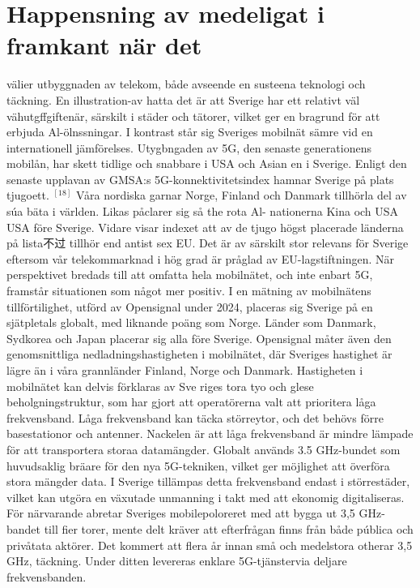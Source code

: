 {{\section*{Happensning av medeligat i framkant när det} välier utbyggnaden av telekom, både avseende en susteena teknologi och täckning. En illustration-av hatta det är att Sverige har ett relativt väl vähutgffgiftenär, särskilt i städer och tätorer, vilket ger en bragrund för att erbjuda Al-ölnssningar. I kontrast står sig Sveriges mobilnät sämre vid en internationell jämförelses.
Utygbngaden av 5G, den senaste generationens mobilån, har skett tidlige och snabbare i USA och Asian en i Sverige. Enligt den senaste upplavan av GMSA:s 5G-konnektivitetsindex hamnar Sverige på plats tjugoett. \({ }^{[18]}\) Våra nordiska garnar Norge, Finland och Danmark tillhörla del av súa bäta i världen. Likas påclarer sig så the rota Al- nationerna Kina och USA USA före Sverige. Vidare visar indexet att av de tjugo
högst placerade länderna på lista不过 tillhör end antist sex EU. Det är av särskilt stor relevans för Sverige eftersom vår telekommarknad i hög grad är pråglad av EU-lagstiftningen.
När perspektivet bredads till att omfatta hela mobilnätet, och inte enbart 5G, framstår situationen som något mer positiv. I en mätning av mobilnätens tillförtilighet, utförd av Opensignal under 2024, placeras sig Sverige på en sjätpletals globalt, med liknande poäng som Norge. Länder som Danmark, Sydkorea och Japan placerar sig alla före Sverige. Opensignal måter även den genomsnittliga nedladningshastigheten i mobilnätet, där Sveriges hastighet är lägre än i våra grannländer Finland, Norge och Danmark.
Hastigheten i mobilnätet kan delvis förklaras av Sve riges tora tyo och glese beholgningstruktur, som har gjort att operatörerna valt att prioritera låga frekvensband. Låga frekvensband kan täcka störreytor, och det behövs förre basestationor och antenner. Nackelen är att låga frekvensband är mindre lämpade för att transportera storaa datamängder.
Globalt används 3.5 GHz-bundet som huvudsaklig bräare för den nya 5G-tekniken, vilket ger möjlighet att överföra stora mängder data. I Sverige tillämpas detta frekvensband endast i störrestäder, vilket kan utgöra en växutade unmanning i takt med att ekonomig digitaliseras. För närvarande abretar Sveriges mobilepoloreret med att bygga ut 3,5 GHz-bandet till fier torer, mente delt kräver att efterfrågan finns från både pública och privåtata aktörer. Det kommert att flera år innan små och medelstora otherar 3,5 GHz, täckning. Under ditten levereras enklare 5G-tjänstervia deljare frekvensbanden.
}}
